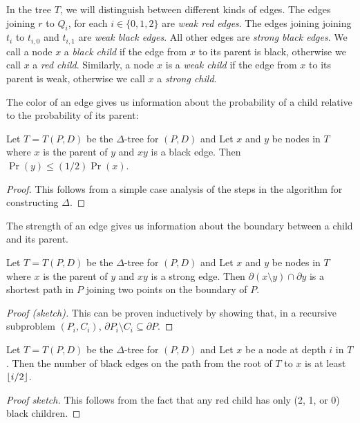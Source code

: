 \documentclass[lotsofwhite]{patmorin}
\newcommand{\boundary}{\partial}
\begin{document}
In the tree $T$, we will distinguish between different kinds of edges.
The edges joining $r$ to $Q_i$, for each $i\in\{0,1,2\}$ are
\emph{weak red edges}.  The edges joining joining $t_i$ to $t_{i,0}$
and $t_{i,1}$ are \emph{weak black edges}.  All other edges are
\emph{strong black edges}.  We call a node $x$ a \emph{black child} if
the edge from $x$ to its parent is black, otherwise we call $x$ a
\emph{red child}.  Similarly, a node $x$ is a \emph{weak child} if the
edge from $x$ to its parent is weak, otherwise we call $x$ a
\emph{strong child}.

The color of an edge gives us information about the probability of a
child relative to the probability of its parent:

\begin{lem}
Let $T=T(P,D)$ be the $\Delta$-tree for $(P,D)$ and
Let $x$ and $y$ be nodes in $T$ where $x$ is the parent of $y$ and
$xy$ is a black edge.  Then $\Pr(y)\le(1/2)\Pr(x)$.
\end{lem}

\begin{proof}
This follows from a simple case analysis of the steps in the algorithm for
constructing $\Delta$.
\end{proof}

The strength of an edge gives us information about the boundary
between a child and its parent.

\begin{lem}
Let $T=T(P,D)$ be the $\Delta$-tree for $(P,D)$ and
Let $x$ and $y$ be nodes in $T$ where $x$ is the parent of $y$ and
$xy$ is a strong edge.  Then $\boundary(x\setminus y)\cap\boundary y$
is a shortest path in $P$ joining two points on the boundary of $P$.
\end{lem}

\begin{proof}[Proof (sketch)]
This can be proven inductively by showing that, in a recursive
subproblem $(P_i,C_i)$, $\boundary P_i\setminus C_i\subseteq \boundary
P$.
\end{proof}

\begin{lem}
Let $T=T(P,D)$ be the $\Delta$-tree for $(P,D)$ and
Let $x$ be a node at depth $i$ in $T$.  Then the number of black edges
on the path from the root of $T$ to $x$ is at least $\left\lfloor i/2 \right\rfloor$.
\end{lem}

\begin{proof}[Proof sketch]
This follows from the fact that any red child has only (2,
1, or 0) black children.
\end{proof}
\end{document}
